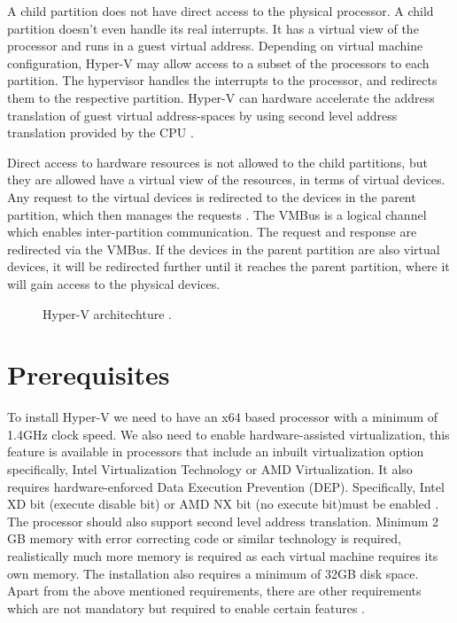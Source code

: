 \documentclass[9pt,twocolumn,twoside]{../../styles/osajnl}
\begin{document}
A child partition does not have direct access to the physical
processor. A child partition doesn't even handle its real
interrupts. It has a virtual view of the processor and runs in a guest
virtual address. Depending on virtual machine configuration, Hyper-V
may allow access to a subset of the processors to each partition. The
hypervisor handles the interrupts to the processor, and redirects them
to the respective partition. Hyper-V can hardware accelerate the
address translation of guest virtual address-spaces by using second
level address translation provided by the CPU \cite{www-hyperv-paper}.

Direct access to hardware resources is not allowed to the child
partitions, but they are allowed have a virtual view of the resources,
in terms of virtual devices. Any request to the virtual devices is
redirected to the devices in the parent partition, which then manages
the requests \cite{www-hyperv-architecture}. The VMBus \CE is a logical
channel which enables inter-partition communication. The request and
response are redirected via the VMBus. If the devices in the parent
partition are also virtual devices, it will be redirected further
until it reaches the parent partition, where it will gain access to
the physical devices.

\begin{figure}[htbp]
\centering
{}
\caption{Hyper-V architechture \cite{www-hyperv-wikipedia}.}
\label{fig:false-color}
\end{figure}

\section{Prerequisites}

To install Hyper-V we need to have an x64 based processor with a
minimum of 1.4GHz clock speed. We also need to enable
hardware-assisted virtualization, this feature is available in
processors that include an inbuilt virtualization option specifically,
Intel Virtualization Technology or AMD Virtualization. It also
requires hardware-enforced Data Execution Prevention
(DEP). Specifically, Intel XD bit (execute disable bit) or AMD NX bit
(no execute bit)must be enabled \cite{www-hyperv-paper2}. The
processor should also support second level address
translation. Minimum 2 GB memory with error correcting code or similar
technology is required, realistically much more memory is required as
each virtual machine requires its own memory. The installation also
requires a minimum of 32GB disk space. Apart from the above mentioned
requirements, there are other requirements which are not mandatory but
required to enable certain features \cite{www-hyperv-wikipedia}.
\end{document}
